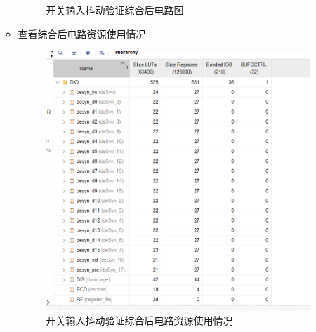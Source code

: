 \documentclass[UTF8,fontset=fandol]{ctexart}
\begin{document}
\begin{itemize}
\begin{itemize}
\begin{figure}[H]
  \caption{开关输入抖动验证综合后电路图}
\end{figure}
\item 查看综合后电路资源使用情况
\begin{figure}[H]
  \centering
  \includegraphics[scale=0.8]{Snipaste_2021-11-25_13-53-26.png}
  \caption{开关输入抖动验证综合后电路资源使用情况}
\end{figure}
\end{itemize}



\end{itemize}
\end{document}
